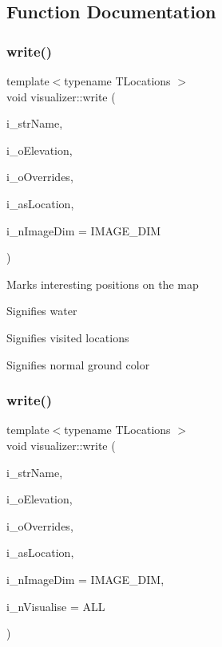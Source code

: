 \subsection{Function Documentation}
\mbox{\label{namespacevisualizer_addbe7459069b4e845756152e1804ca76}} 
\subsubsection{\texorpdfstring{write()}{write()}\hspace{0.1cm}{\footnotesize\ttfamily [1/2]}}
{\footnotesize\ttfamily template$<$typename T\+Locations $>$ \\
void visualizer\+::write (\begin{DoxyParamCaption}\item[{std\+::string}]{i\+\_\+str\+Name,  }\item[{uint8\+\_\+t $\ast$}]{i\+\_\+o\+Elevation,  }\item[{uint8\+\_\+t $\ast$}]{i\+\_\+o\+Overrides,  }\item[{std\+::vector$<$ T\+Locations $>$}]{i\+\_\+as\+Location,  }\item[{int}]{i\+\_\+n\+Image\+Dim = {\ttfamily IMAGE\+\_\+DIM} }\end{DoxyParamCaption})}

Marks interesting positions on the map

Signifies water

Signifies visited locations

Signifies normal ground color \mbox{\label{namespacevisualizer_a67da0136480955913d914be67573251d}} 
\subsubsection{\texorpdfstring{write()}{write()}\hspace{0.1cm}{\footnotesize\ttfamily [2/2]}}
{\footnotesize\ttfamily template$<$typename T\+Locations $>$ \\
void visualizer\+::write (\begin{DoxyParamCaption}\item[{std\+::string}]{i\+\_\+str\+Name,  }\item[{uint8\+\_\+t $\ast$}]{i\+\_\+o\+Elevation,  }\item[{uint8\+\_\+t $\ast$}]{i\+\_\+o\+Overrides,  }\item[{std\+::vector$<$ T\+Locations $>$}]{i\+\_\+as\+Location,  }\item[{int}]{i\+\_\+n\+Image\+Dim = {\ttfamily IMAGE\+\_\+DIM},  }\item[{int}]{i\+\_\+n\+Visualise = {\ttfamily ALL} }\end{DoxyParamCaption})}

